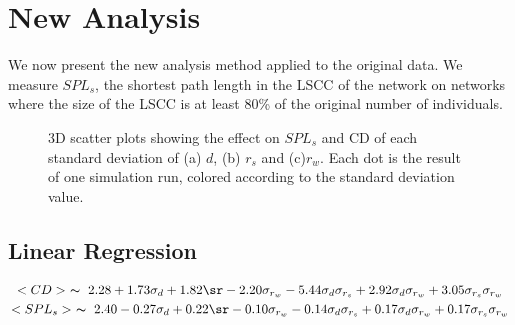 \section{New Analysis}
We now present the new analysis method applied to the original data.
We measure $SPL_s$, the
shortest path length in the LSCC of the network on networks where the size of
the LSCC is at least 80\% of the original number of individuals.

\begin{figure}[hbt!]\centering
    \par

    \hfill

    \caption{3D scatter plots showing the effect on $SPL_s$ and CD of each
    standard deviation of
    (a) $d$, (b) $r_s$ and (c)$r_w$. Each dot is the result of one simulation run, colored
    according to the standard deviation value.}
    \label{figure}
\end{figure}

\subsection{Linear Regression}

\begin{gather}\label{eq:reduced}
    <CD> ~ \thicksim ~ 2.28 + 1.73\sd + 1.82\sr - 2.20\sw -
                5.44\ds + 2.92\dw + 3.05\ssw \label{red1}\\
    <SPL_s> ~ \thicksim ~ 2.40 - 0.27\sd + 0.22\sr - 0.10 \sw -
                0.14\ds + 0.17\dw + 0.17\ssw \label{red2}
\end{gather}